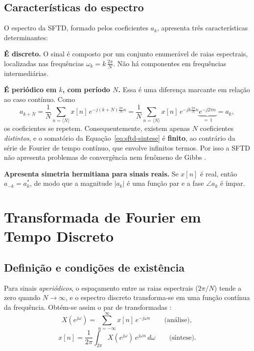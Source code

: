 \documentclass[
    12pt,
    openright,
    oneside,
    a4paper,
    chapter=TITLE,
    section=TITLE,
    brazil
]{abntex2}
\begin{document}
\section{Características do espectro}

O espectro da SFTD, formado pelos coeficientes $a_k$, apresenta três características
determinantes:

\begin{alineas}
\item \textbf{É discreto.} O sinal é composto por um conjunto enumerável de raias
espectrais, localizadas nas frequências $\omega_k = k\,\frac{2\pi}{N}$. Não há
componentes em frequências intermediárias.

\item \textbf{É periódico em $k$, com período $N$.} Essa é uma diferença marcante em
relação ao caso contínuo. Como
\begin{equation}
    a_{k+N} = \frac{1}{N}\sum_{n=\langle N\rangle} x[n]\,e^{-j(k+N)\frac{2\pi}{N}n}
            = \frac{1}{N}\sum_{n=\langle N\rangle} x[n]\,e^{-jk\frac{2\pi}{N}n}
              \underbrace{e^{-j2\pi n}}_{=\,1} = a_k,
\end{equation}
os coeficientes se repetem. Consequentemente, existem apenas $N$ coeficientes
\emph{distintos}, e o somatório da Equação~\eqref{eq:sftd-sintese} é
\textbf{finito}, ao contrário da série de Fourier de tempo contínuo, que envolve
infinitos termos. Por isso a SFTD não apresenta problemas de convergência nem fenômeno
de Gibbs \cite{lathi2007}.

\item \textbf{Apresenta simetria hermitiana para sinais reais.} Se $x[n]$ é real, então
$a_{-k} = a_k^{*}$, de modo que a magnitude $|a_k|$ é uma função par e a fase
$\angle a_k$ é ímpar.
\end{alineas}

\vspace{1cm}

\chapter{Transformada de Fourier em Tempo Discreto}
\label{cap:tftd}

\section{Definição e condições de existência}

Para sinais \emph{aperiódicos}, o espaçamento entre as raias espectrais
($2\pi/N$) tende a zero quando $N\to\infty$, e o espectro discreto transforma-se em uma
função contínua da frequência. Obtém-se assim o par de transformadas
\cite{oppenheim2013}:
\begin{equation}
    X(e^{j\omega}) = \sum_{n=-\infty}^{\infty} x[n]\,e^{-j\omega n}
    \qquad\text{(análise)},
    \label{eq:tftd-analise}
\end{equation}
\begin{equation}
    x[n] = \frac{1}{2\pi}\int_{2\pi} X(e^{j\omega})\,e^{j\omega n}\,d\omega
    \qquad\text{(síntese)}.
    \label{eq:tftd-sintese}
\end{equation}
\end{document}
